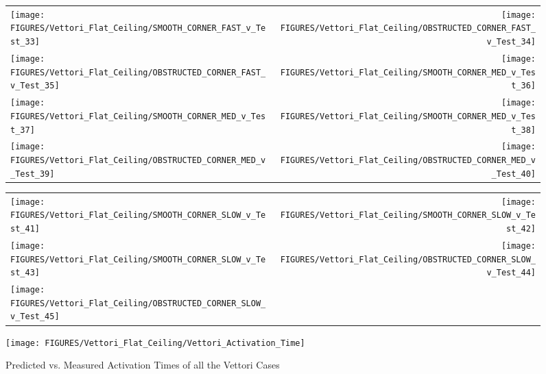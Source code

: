 \begin{figure}[p]
\begin{tabular*}{\textwidth}{l@{\extracolsep{\fill}}r}
\texttt{[image: FIGURES/Vettori\_Flat\_Ceiling/SMOOTH\_CORNER\_FAST\_v\_Test\_33]} &
\texttt{[image: FIGURES/Vettori\_Flat\_Ceiling/OBSTRUCTED\_CORNER\_FAST\_v\_Test\_34]} \\
\texttt{[image: FIGURES/Vettori\_Flat\_Ceiling/OBSTRUCTED\_CORNER\_FAST\_v\_Test\_35]} &
\texttt{[image: FIGURES/Vettori\_Flat\_Ceiling/SMOOTH\_CORNER\_MED\_v\_Test\_36]} \\
\texttt{[image: FIGURES/Vettori\_Flat\_Ceiling/SMOOTH\_CORNER\_MED\_v\_Test\_37]} &
\texttt{[image: FIGURES/Vettori\_Flat\_Ceiling/SMOOTH\_CORNER\_MED\_v\_Test\_38]} \\
\texttt{[image: FIGURES/Vettori\_Flat\_Ceiling/OBSTRUCTED\_CORNER\_MED\_v\_Test\_39]} &
\texttt{[image: FIGURES/Vettori\_Flat\_Ceiling/OBSTRUCTED\_CORNER\_MED\_v\_Test\_40]} \\
\end{tabular*}
\label{Vettori_5}
\end{figure}

\begin{figure}[p]
\begin{tabular*}{\textwidth}{l@{\extracolsep{\fill}}r}
\texttt{[image: FIGURES/Vettori\_Flat\_Ceiling/SMOOTH\_CORNER\_SLOW\_v\_Test\_41]} &
\texttt{[image: FIGURES/Vettori\_Flat\_Ceiling/SMOOTH\_CORNER\_SLOW\_v\_Test\_42]} \\
\texttt{[image: FIGURES/Vettori\_Flat\_Ceiling/SMOOTH\_CORNER\_SLOW\_v\_Test\_43]} &
\texttt{[image: FIGURES/Vettori\_Flat\_Ceiling/OBSTRUCTED\_CORNER\_SLOW\_v\_Test\_44]} \\
\texttt{[image: FIGURES/Vettori\_Flat\_Ceiling/OBSTRUCTED\_CORNER\_SLOW\_v\_Test\_45]} \\
\end{tabular*}
\label{Vettori_6}
\end{figure}

\begin{figure}[p]
\begin{center}
\texttt{[image: FIGURES/Vettori\_Flat\_Ceiling/Vettori\_Activation\_Time]}
\end{center}
\caption{Predicted vs. Measured Activation Times of all the Vettori Cases}
\label{Vettori_Activation}
\end{figure}




